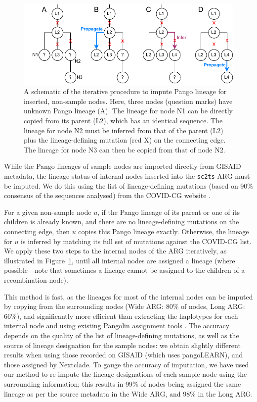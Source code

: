 \documentclass{article}
\begin{document}
\begin{figure} \centering
\includegraphics[width=.7\textwidth]{figures/imputation.pdf}
\caption{\label{fig:imputation}A schematic of the iterative procedure to impute
Pango lineage for inserted, non-sample nodes. Here, three nodes (question
marks) have unknown Pango lineage (A). The lineage for node N1 can be directly
copied from its parent (L2), which has an identical sequence. The lineage for node N2 must be inferred from
that of the parent (L2) plus the lineage-defining mutation (red X)
on the connecting edge. The lineage for node N3 can then be copied from
that of node N2.}
\end{figure}
While the Pango lineages of sample nodes are imported directly from
GISAID metadata, the lineage status of internal nodes inserted into
the \texttt{sc2ts} ARG must be imputed. We do this using
the list of lineage-defining mutations (based on 90\% consensus
of the sequences analysed) from the
COVID-CG website \citep[][\url{https://covidcg.org/};
accessed on 2022-11-04]{Chen2021-zc}.

For a given non-sample node $u$, if the Pango lineage of its parent or
one of its children is already known, and there are no lineage-defining mutations
on the connecting edge, then $u$ copies this Pango lineage exactly.
Otherwise, the lineage for $u$ is inferred by
matching its full set of mutations against the COVID-CG list.
We apply these two steps to the internal nodes of the ARG iteratively,
as illustrated in Figure~\ref{fig:imputation}, until all internal nodes
are assigned a lineage (where possible---note that sometimes a lineage cannot
be assigned to the children of a recombination node).

This method is fast, as the lineages for most of the internal nodes can be
imputed by copying from the surrounding nodes
(Wide ARG: 80\% of nodes,
Long ARG: 66\%),
and significantly more efficient than extracting
the haplotypes for each internal node and using existing Pangolin assignment tools
\citep{OToole2021-assignment}. The
accuracy depends on the quality of the list of lineage-defining mutations,
as well as the source of lineage designation for the sample nodes: we obtain
slightly different results when using those recorded on GISAID (which uses
pangoLEARN), and those assigned by Nextclade. To gauge the accuracy of
imputation, we have used our method to re-impute the lineage designations of each
sample node using the surrounding information; this results in
99\% of nodes being assigned the same lineage as per the source metadata in the
Wide ARG, and 98\% in the Long ARG.
\end{document}
